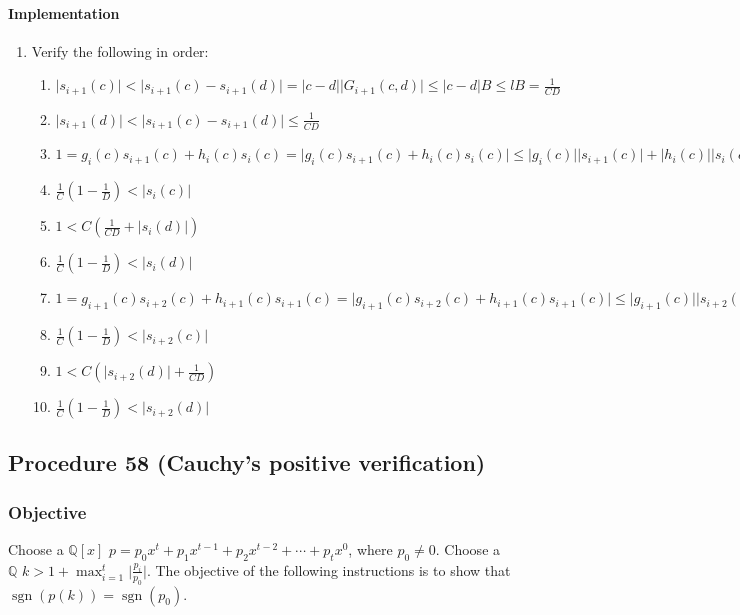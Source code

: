 \documentclass[twocolumn]{article}
\DeclareMathOperator{\sgn}{sgn}
\begin{document}
				\paragraph{Implementation}
					\begin{enumerate}
						\item Verify the following in order:
						\begin{enumerate}
							\item $\lvert s_{i+1}(c)\rvert<\lvert s_{i+1}(c)-s_{i+1}(d)\rvert=\lvert c-d\rvert\lvert G_{i+1}(c,d)\rvert\le\lvert c-d\rvert B\le lB=\frac{1}{CD}$
							\item $\lvert s_{i+1}(d)\rvert<\lvert s_{i+1}(c)-s_{i+1}(d)\rvert\le\frac{1}{CD}$
							\item $1=g_{i}(c)s_{i+1}(c)+h_{i}(c)s_{i}(c)=\lvert g_{i}(c)s_{i+1}(c)+h_{i}(c)s_{i}(c)\rvert\le\lvert g_{i}(c)\rvert\lvert s_{i+1}(c)\rvert+\lvert h_{i}(c)\rvert\lvert s_{i}(c)\rvert<C(\frac{1}{CD}+\lvert s_{i}(c)\rvert)$
							\item $\frac{1}{C}(1-\frac{1}{D})<\lvert s_{i}(c)\rvert$
							\item $1<C(\frac{1}{CD}+\lvert s_{i}(d)\rvert)$
							\item $\frac{1}{C}(1-\frac{1}{D})<\lvert s_{i}(d)\rvert$
							\item $1=g_{i+1}(c)s_{i+2}(c)+h_{i+1}(c)s_{i+1}(c)=\lvert g_{i+1}(c)s_{i+2}(c)+h_{i+1}(c)s_{i+1}(c)\rvert\le\lvert g_{i+1}(c)\rvert\lvert s_{i+2}(c)\rvert+\lvert h_{i+1}(c)\rvert\lvert s_{i+1}(c)\rvert<C(\lvert s_{i+2}(c)\rvert+\frac{1}{CD})$
							\item $\frac{1}{C}(1-\frac{1}{D})<\lvert s_{i+2}(c)\rvert$
							\item $1<C(\lvert s_{i+2}(d)\rvert+\frac{1}{CD})$
							\item $\frac{1}{C}(1-\frac{1}{D})<\lvert s_{i+2}(d)\rvert$
						\end{enumerate}
					\end{enumerate}
		\subsection{Procedure 58 (Cauchy's positive verification)}\label{sec:procedure 58}
			\subsubsection{Objective}
				Choose a $\mathbb{Q}[x]$ $p=p_0x^t+p_1x^{t-1}+p_2x^{t-2}+\cdots+p_tx^0$, where $p_0\ne 0$. Choose a $\mathbb{Q}$ $k>1+\max_{i=1}^t\lvert\frac{p_i}{p_0}\rvert$. The objective of the following instructions is to show that $\sgn(p(k))=\sgn(p_0)$.
\end{document}
